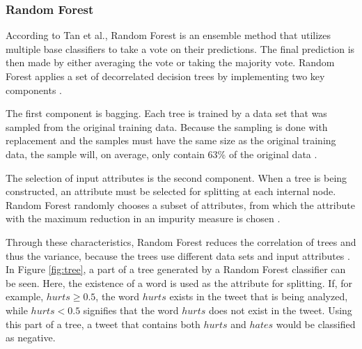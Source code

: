 \subsubsection{Random Forest}
        According to Tan et al., Random Forest is an ensemble method that utilizes multiple base classifiers to take a vote on their predictions. The final prediction is then made by either averaging the vote or taking the majority vote. Random Forest applies a set of decorrelated decision trees by implementing two key components \cite{DBLP:books/aw/TanSKK2019}.
        
        The first component is bagging. Each tree is trained by a data set that was sampled from the original training data. Because the sampling is done with replacement and the samples must have the same size as the original training data, the sample will, on average, only contain 63\% of the original data \cite{DBLP:books/aw/TanSKK2019}.
        
        The selection of input attributes is the second component. When a tree is being constructed, an attribute must be selected for splitting at each internal node. Random Forest randomly chooses a subset of attributes, from which the attribute with the maximum reduction in an impurity measure is chosen \cite{DBLP:books/aw/TanSKK2019}.
        
        Through these characteristics, Random Forest reduces the correlation of trees and thus the variance, because the trees use different data sets and input attributes \cite{DBLP:books/aw/TanSKK2019}. In Figure \ref{fig:tree}, a part of a tree generated by a Random Forest classifier can be seen. Here, the existence of a word is used as the attribute for splitting. If, for example, $hurts \geq 0.5$, the word $hurts$ exists in the tweet that is being analyzed, while $hurts < 0.5$ signifies that the word $hurts$ does not exist in the tweet. Using this part of a tree, a tweet that contains both $hurts$ and $hates$ would be classified as negative.
        
